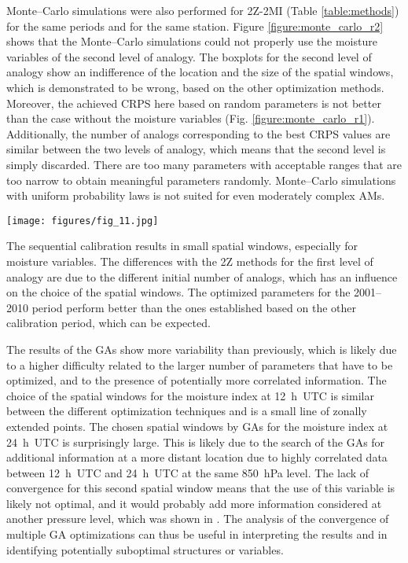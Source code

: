 \documentclass[review]{elsarticle}
\begin{document}
Monte--Carlo simulations were also performed for 2Z-2MI (Table \ref{table:methods}) for the same periods and for the same station. Figure \ref{figure:monte_carlo_r2} shows that the Monte--Carlo simulations could not properly use the moisture variables of the second level of analogy. The boxplots for the second level of analogy show an indifference of the location and the size of the spatial windows, which is demonstrated to be wrong, based on the other optimization methods. Moreover, the achieved CRPS here based on random parameters is not better than the case without the moisture variables (Fig. \ref{figure:monte_carlo_r1}). Additionally, the number of analogs corresponding to the best CRPS values are similar between the two levels of analogy, which means that the second level is simply discarded. There are too many parameters with acceptable ranges that are too narrow to obtain meaningful parameters randomly. Monte--Carlo simulations with uniform probability laws is not suited for even moderately complex AMs. 

\begin{figure*}[hbt!]
	\texttt{[image: figures/fig\_11.jpg]}
	\caption{Same as Fig. \ref{figure:monte_carlo_r1} but for 2Z-2MI (Table \ref{table:methods}). Results are shown for both levels of analogy (geopotential height and moisture index).}
	\label{figure:monte_carlo_r2}
\end{figure*}
\clearpage

The sequential calibration results in small spatial windows, especially for moisture variables. The differences with the 2Z methods for the first level of analogy are due to the different initial number of analogs, which has an influence on the choice of the spatial windows. The optimized parameters for the 2001--2010 period perform better than the ones established based on the other calibration period, which can be expected.

The results of the GAs show more variability than previously, which is likely due to a higher difficulty related to the larger number of parameters that have to be optimized, and to the presence of potentially more correlated information. The choice of the spatial windows for the moisture index at 12~h~UTC is similar between the different optimization techniques and is a small line of zonally extended points. The chosen spatial windows by GAs for the moisture index at 24~h~UTC is surprisingly large. This is likely due to the search of the GAs for additional information at a more distant location due to highly correlated data between 12~h~UTC and 24~h~UTC at the same 850~hPa level. The lack of convergence for this second spatial window means that the use of this variable is likely not optimal, and it would probably add more information considered at another pressure level, which was shown in \citet{Horton2018a}. The analysis of the convergence of multiple GA optimizations can thus be useful in interpreting the results and in identifying potentially suboptimal structures or variables.
\end{document}
